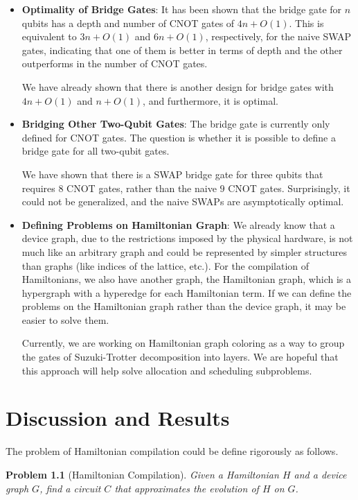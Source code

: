 \documentclass{report}
\newtheorem{problem}{Problem}
\begin{document}
\begin{itemize}
  \item \textbf{Optimality of Bridge Gates}: It has been shown that the bridge gate for $n$ qubits has a depth and number of CNOT gates of $4n + O(1)$. This is equivalent to $3n + O(1)$ and $6n + O(1)$, respectively, for the naive SWAP gates, indicating that one of them is better in terms of depth and the other outperforms in the number of CNOT gates.

  We have already shown that there is another design for bridge gates with $4n + O(1)$ and $n + O(1)$, and furthermore, it is optimal.

  \item \textbf{Bridging Other Two-Qubit Gates}: The bridge gate is currently only defined for CNOT gates. The question is whether it is possible to define a bridge gate for all two-qubit gates.
  
  We have shown that there is a SWAP bridge gate for three qubits that requires $8$ CNOT gates, rather than the naive $9$ CNOT gates. Surprisingly, it could not be generalized, and the naive SWAPs are asymptotically optimal.

  \item \textbf{Defining Problems on Hamiltonian Graph}: We already know that a device graph, due to the restrictions imposed by the physical hardware, is not much like an arbitrary graph and could be represented by simpler structures than graphs (like indices of the lattice, etc.). For the compilation of Hamiltonians, we also have another graph, the Hamiltonian graph, which is a hypergraph with a hyperedge for each Hamiltonian term. If we can define the problems on the Hamiltonian graph rather than the device graph, it may be easier to solve them. 

  Currently, we are working on Hamiltonian graph coloring as a way to group the gates of Suzuki-Trotter decomposition into layers. We are hopeful that this approach will help solve 
  allocation and scheduling subproblems.
  
\end{itemize}

\chapter{Discussion and Results}\label{chap:discussion}

The problem of Hamiltonian compilation could be define rigorously as follows.

\begin{problem}[Hamiltonian Compilation]
  Given a Hamiltonian $H$ and a device graph $G$, find a circuit $C$ that approximates the evolution of $H$ on $G$.
\end{problem}
\end{document}
